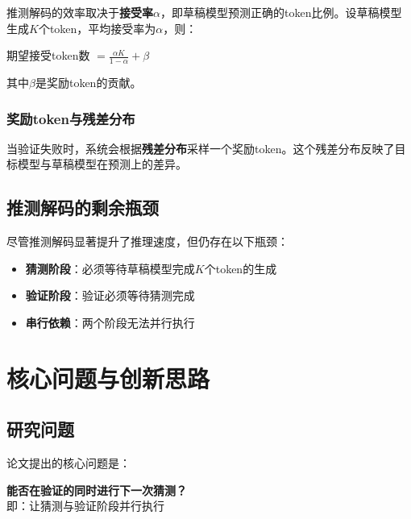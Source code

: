 \documentclass[11pt,a4paper]{article}
\newcommand{\term}[1]{\textcolor{primarypurple}{\textbf{#1}}}
\begin{document}
推测解码的效率取决于\term{接受率}$\alpha$，即草稿模型预测正确的token比例。设草稿模型生成$K$个token，平均接受率为$\alpha$，则：

\begin{equationbox}
  \centering
  期望接受token数 $= \frac{\alpha K}{1 - \alpha} + \beta$
\end{equationbox}

其中$\beta$是奖励token的贡献。

\subsubsection{奖励token与残差分布}

当验证失败时，系统会根据\term{残差分布}采样一个奖励token。这个残差分布反映了目标模型与草稿模型在预测上的差异。

\subsection{推测解码的剩余瓶颈}

尽管推测解码显著提升了推理速度，但仍存在以下瓶颈：

\begin{warningbox}[当前瓶颈]
  \begin{itemize}
    \item \textbf{猜测阶段}：必须等待草稿模型完成$K$个token的生成
    \item \textbf{验证阶段}：验证必须等待猜测完成
    \item \textbf{串行依赖}：两个阶段无法并行执行
  \end{itemize}
\end{warningbox}

\newpage

\section{核心问题与创新思路}

\subsection{研究问题}

论文提出的核心问题是：

\begin{infobox}[核心研究问题]
  \centering
  \textbf{能否在验证的同时进行下一次猜测？}\\[5pt]
  即：让猜测与验证阶段并行执行
\end{infobox}
\end{document}
